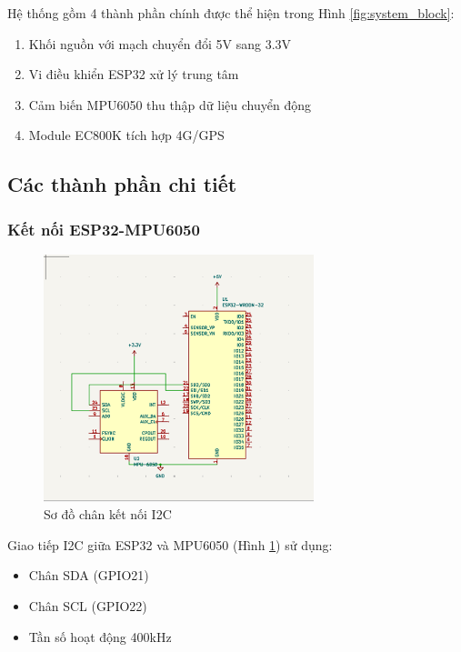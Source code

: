 \documentclass[a4paper,12pt]{report}
\begin{document}
	Hệ thống gồm 4 thành phần chính được thể hiện trong Hình \ref{fig:system_block}:
	\begin{enumerate}
		\item Khối nguồn với mạch chuyển đổi 5V sang 3.3V
		\item Vi điều khiển ESP32 xử lý trung tâm
		\item Cảm biến MPU6050 thu thập dữ liệu chuyển động
		\item Module EC800K tích hợp 4G/GPS
	\end{enumerate}
	
	\subsection{Các thành phần chi tiết}
	
	
	\subsubsection{Kết nối ESP32-MPU6050}
	\begin{figure}[H]
		\centering
		\includegraphics[width=0.7\textwidth]{ESP32_MPU6050_SCHEMATIC.png}
		\caption{Sơ đồ chân kết nối I2C}
		\label{fig:i2c_connection}
	\end{figure}
	
	Giao tiếp I2C giữa ESP32 và MPU6050 (Hình \ref{fig:i2c_connection}) sử dụng:
	\begin{itemize}
		\item Chân SDA (GPIO21)
		\item Chân SCL (GPIO22)
		\item Tần số hoạt động 400kHz
	\end{itemize}
	
\end{document}

